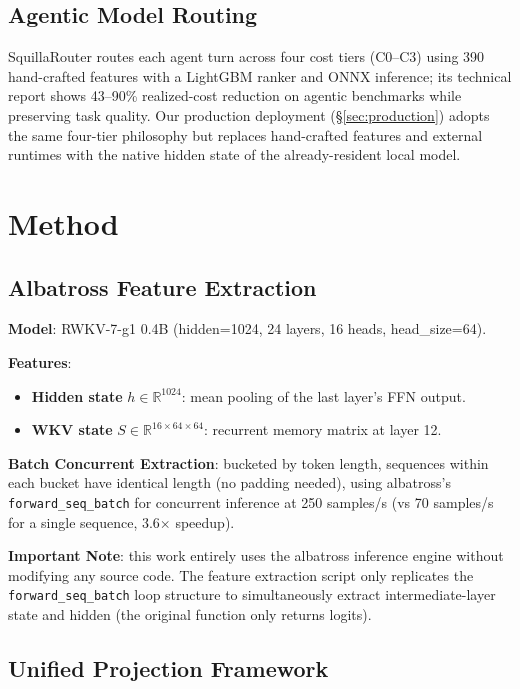 \documentclass[11pt]{article}
\begin{document}
\subsection{Agentic Model Routing}

SquillaRouter \cite{squillarouter} routes each agent turn across four cost
tiers (C0--C3) using 390 hand-crafted features with a LightGBM ranker and
ONNX inference; its technical report shows 43--90\% realized-cost reduction
on agentic benchmarks while preserving task quality. Our production
deployment (\S\ref{sec:production}) adopts the same four-tier philosophy but
replaces hand-crafted features and external runtimes with the native hidden
state of the already-resident local model.

\section{Method}

\subsection{Albatross Feature Extraction}

\textbf{Model}: RWKV-7-g1 0.4B (hidden=1024, 24 layers, 16 heads,
head\_size=64).

\textbf{Features}:
\begin{itemize}
  \item \textbf{Hidden state} $h \in \mathbb{R}^{1024}$: mean pooling of the
  last layer's FFN output.
  \item \textbf{WKV state} $S \in \mathbb{R}^{16 \times 64 \times 64}$:
  recurrent memory matrix at layer 12.
\end{itemize}

\textbf{Batch Concurrent Extraction}: bucketed by token length, sequences
within each bucket have identical length (no padding needed), using
albatross's \texttt{forward\_seq\_batch} for concurrent inference at 250
samples/s (vs 70 samples/s for a single sequence, 3.6$\times$ speedup).

\textbf{Important Note}: this work entirely uses the albatross inference
engine without modifying any source code. The feature extraction script only
replicates the \texttt{forward\_seq\_batch} loop structure to simultaneously
extract intermediate-layer state and hidden (the original function only
returns logits).

\subsection{Unified Projection Framework}
\end{document}
